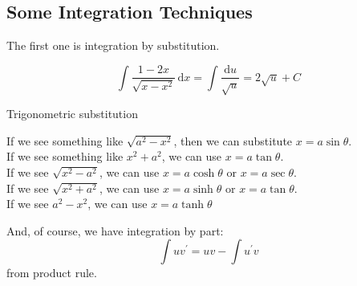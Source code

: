 \subsection{Some Integration Techniques}
The first one is integration by substitution.
\begin{example}
    $$\int\frac{1-2x}{\sqrt{x-x^2}}\,\mathrm dx=\int\frac{\mathrm du}{\sqrt u}=2\sqrt{u}+C$$
\end{example}
Trigonometric substitution
\begin{example}
    If we see something like $\sqrt{a^2-x^2}$, then we can substitute $x=a\sin\theta$.\\
    If we see something like $x^2+a^2$, we can use $x=a\tan\theta$.\\
    If we see $\sqrt{x^2-a^2}$, we can use $x=a\cosh\theta$ or $x=a\sec\theta$.\\
    If we see $\sqrt{x^2+a^2}$, we can use $x=a\sinh\theta$ or $x=a\tan\theta$.\\
    If we see $a^2-x^2$, we can use $x=a\tanh\theta$
\end{example}
And, of course, we have integration by part:
$$\int uv^\prime=uv-\int u^\prime v$$
from product rule.